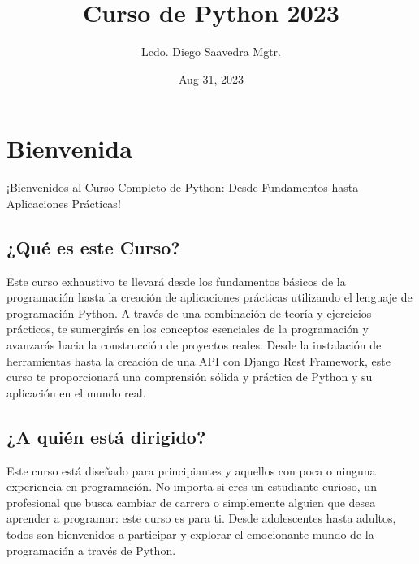 \documentclass[
  a4paper,
  DIV=11,
  numbers=noendperiod,
  onepage,
  openany]{scrreprt}
\title{Curso de Python 2023}
\author{Lcdo. Diego Saavedra Mgtr.}
\date{Aug 31, 2023}
\renewcommand*\contentsname{Table of contents}
\newcommand\contentsname{Table of contents}
\begin{document}
\maketitle
\ifdefined\Shaded\renewenvironment{Shaded}{\begin{tcolorbox}[enhanced, interior hidden, frame hidden, borderline west={3pt}{0pt}{shadecolor}, sharp corners, breakable, boxrule=0pt]}{\end{tcolorbox}}\fi

\renewcommand*\contentsname{Table of contents}
{
\hypersetup{linkcolor=}
\setcounter{tocdepth}{2}
\tableofcontents
}

\hypertarget{bienvenida}{%
\chapter{Bienvenida}\label{bienvenida}}

¡Bienvenidos al Curso Completo de Python: Desde Fundamentos hasta
Aplicaciones Prácticas!

\hypertarget{quuxe9-es-este-curso}{%
\section{¿Qué es este Curso?}\label{quuxe9-es-este-curso}}

Este curso exhaustivo te llevará desde los fundamentos básicos de la
programación hasta la creación de aplicaciones prácticas utilizando el
lenguaje de programación Python. A través de una combinación de teoría y
ejercicios prácticos, te sumergirás en los conceptos esenciales de la
programación y avanzarás hacia la construcción de proyectos reales.
Desde la instalación de herramientas hasta la creación de una API con
Django Rest Framework, este curso te proporcionará una comprensión
sólida y práctica de Python y su aplicación en el mundo real.

\hypertarget{a-quiuxe9n-estuxe1-dirigido}{%
\section{¿A quién está dirigido?}\label{a-quiuxe9n-estuxe1-dirigido}}

Este curso está diseñado para principiantes y aquellos con poca o
ninguna experiencia en programación. No importa si eres un estudiante
curioso, un profesional que busca cambiar de carrera o simplemente
alguien que desea aprender a programar: este curso es para ti. Desde
adolescentes hasta adultos, todos son bienvenidos a participar y
explorar el emocionante mundo de la programación a través de Python.
\end{document}

